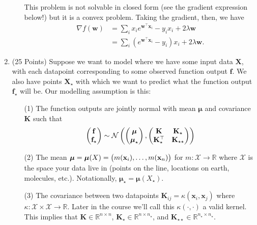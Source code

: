 \documentclass[letter, 12pt]{article}
\begin{document}
\begin{enumerate}
\begin{enumerate}
            This problem is not solvable in closed form (see the gradient expression below!)
            but it is a convex problem. Taking the gradient, then, we have
            \begin{align*}
                \nabla f(\mathbf{w}) &= \sum_i x_i e^{\mathbf{w}^\top\mathbf{x}_i} - y_i x_i + 2\lambda \mathbf{w}\\
                &= \sum_i \left(e^{\mathbf{w}^\top\mathbf{x}_i} - y_i\right) x_i + 2\lambda \mathbf{w}.
            \end{align*}
            \vfill
    \end{enumerate}
    \clearpage
\item (25 Points) Suppose we want to model where we have some input
    data $\mathbf{X}$, with each datapoint corresponding to some observed function output
    $\mathbf{f}$. We also have points $\mathbf{X}_\star$ with which we want to predict
    what the function output $\mathbf{f}_\star$ will be. Our modelling assumption is this:
    \begin{enumerate}
        \item[(1)] The function outputs are jointly normal with mean $\boldsymbol{\mu}$ and
            covariance $\mathbf{K}$ such that
            \[
                \left(\begin{matrix}\mathbf{f}\\\mathbf{f}_\star\end{matrix}\right) \sim \mathcal{N}\left(\left(\begin{matrix}\boldsymbol{\mu}\\\boldsymbol{\mu}_\star\end{matrix}\right),\left(\begin{matrix}\mathbf{K}&\mathbf{K}_\star\\\mathbf{K}_\star^\top&\mathbf{K}_{\star\star}\end{matrix}\right)\right)
            \]
        \item[(2)] The mean $\boldsymbol{\mu} = \boldsymbol{\mu}(X) =
            \left(\begin{matrix}m(\mathbf{x}_i),\dots,m(\mathbf{x}_n)\end{matrix}\right)$ for $m : \mathcal{X} \rightarrow
            \mathbb{R}$ where $\mathcal{X}$ is the space your data live in (points on
            the line, locations on earth, molecules, etc.). Notationally,
            $\boldsymbol{\mu}_\star = \boldsymbol{\mu}(X_\star)$.
        \item[(3)] The covariance between two datapoints $\mathbf{K}_{ij} =
            \kappa(\mathbf{x}_i,\mathbf{x}_j)$ where $\kappa : \mathcal{X}\times
            \mathcal{X}\rightarrow \mathbb{R}$. Later in the course we'll call this
            $\kappa(\cdot,\cdot)$ a valid kernel. This implies
            that $\mathbf{K}\in\mathbb{R}^{n\times n}$, $\mathbf{K}_\star\in
            \mathbb{R}^{n\times n_\star}$, and $\mathbf{K}_{\star\star}\in
            \mathbb{R}^{n_\star\times n_\star}$.

\end{enumerate}
\end{enumerate}
\end{document}
